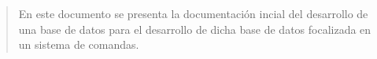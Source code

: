 \newpage
\begin{abstract}
    
   En este documento se presenta la documentación incial del desarrollo de una base de datos para el desarrollo de dicha base de datos focalizada en un sistema de comandas.

\end{abstract}
\thispagestyle{empty}
\clearpage